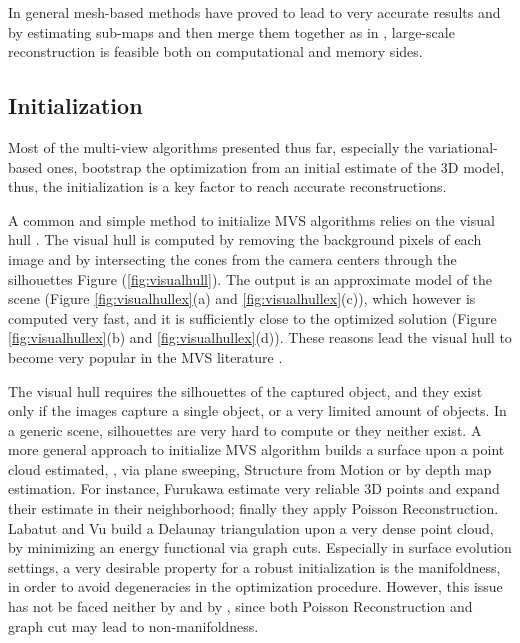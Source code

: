 In general mesh-based methods have proved to lead to very accurate results and  by estimating  sub-maps and then merge them together as in \cite{vu2011large},  large-scale reconstruction is feasible both on computational and memory sides.


\subsection{Initialization}
Most of the  multi-view algorithms presented thus far, especially the variational-based ones, bootstrap the optimization from an initial estimate of the 3D model, thus, the initialization is a key factor to reach accurate reconstructions.

A common and simple method to initialize MVS algorithms relies on the visual hull \cite{laurentini1994visual}. 
The visual hull is computed by removing the background pixels of each image and by intersecting the cones from the camera centers through the silhouettes Figure (\ref{fig:visualhull}). 
The output is an approximate model of the scene (Figure \ref{fig:visualhullex}(a) and \ref{fig:visualhullex}(c)), which however is computed very fast, and it is sufficiently close to the optimized solution (Figure \ref{fig:visualhullex}(b) and \ref{fig:visualhullex}(d)). These reasons lead the visual hull to become very popular in the MVS literature \cite{jin2002variational,soatto2003tales,zaharescu2007transformesh,yoon2010joint}.

The visual hull requires the silhouettes of the captured object, and they exist only if the images capture a single object, or a very limited amount of objects.
In a generic scene, silhouettes are very hard to compute or they neither exist.
A more general approach to initialize MVS algorithm builds a surface upon a point cloud estimated, \eg, via plane sweeping, Structure from Motion or by depth map estimation.
For instance, Furukawa \etal \cite{fu10} estimate very reliable 3D points and expand their estimate in their neighborhood; finally they apply Poisson Reconstruction. 
Labatut \etal \cite{labatut2007efficient} and Vu \etal \cite{vu_et_al_2012} build a Delaunay triangulation upon a very dense point cloud, by minimizing an energy functional via graph cuts.
Especially in surface evolution settings, a very desirable property for a robust initialization is the manifoldness, in order to avoid degeneracies in the optimization procedure. 
However, this issue has not be faced neither by \cite{fu10} and by \cite{labatut2007efficient,vu_et_al_2012}, since both Poisson Reconstruction and graph cut may lead to non-manifoldness.

